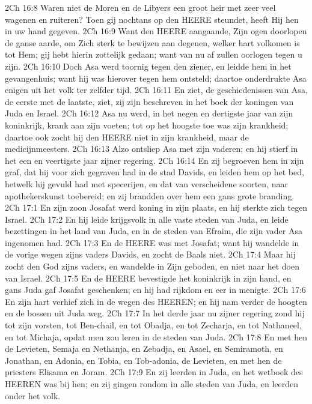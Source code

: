 2Ch 16:8  Waren niet de Moren en de Libyers een groot heir met zeer veel wagenen en ruiteren? Toen gij nochtans op den HEERE steundet, heeft Hij hen in uw hand gegeven.
2Ch 16:9  Want den HEERE aangaande, Zijn ogen doorlopen de ganse aarde, om Zich sterk te bewijzen aan degenen, welker hart volkomen is tot Hem; gij hebt hierin zottelijk gedaan; want van nu af zullen oorlogen tegen u zijn.
2Ch 16:10  Doch Asa werd toornig tegen den ziener, en leidde hem in het gevangenhuis; want hij was hierover tegen hem ontsteld; daartoe onderdrukte Asa enigen uit het volk ter zelfder tijd.
2Ch 16:11  En ziet, de geschiedenissen van Asa, de eerste met de laatste, ziet, zij zijn beschreven in het boek der koningen van Juda en Israel.
2Ch 16:12  Asa nu werd, in het negen en dertigste jaar van zijn koninkrijk, krank aan zijn voeten; tot op het hoogste toe was zijn krankheid; daartoe ook zocht hij den HEERE niet in zijn krankheid, maar de medicijnmeesters.
2Ch 16:13  Alzo ontsliep Asa met zijn vaderen; en hij stierf in het een en veertigste jaar zijner regering.
2Ch 16:14  En zij begroeven hem in zijn graf, dat hij voor zich gegraven had in de stad Davids, en leiden hem op het bed, hetwelk hij gevuld had met specerijen, en dat van verscheidene soorten, naar apothekerskunst toebereid; en zij brandden over hem een gans grote branding.
2Ch 17:1  En zijn zoon Josafat werd koning in zijn plaats, en hij sterkte zich tegen Israel.
2Ch 17:2  En hij leide krijgsvolk in alle vaste steden van Juda, en leide bezettingen in het land van Juda, en in de steden van Efraim, die zijn vader Asa ingenomen had.
2Ch 17:3  En de HEERE was met Josafat; want hij wandelde in de vorige wegen zijns vaders Davids, en zocht de Baals niet.
2Ch 17:4  Maar hij zocht den God zijns vaders, en wandelde in Zijn geboden, en niet naar het doen van Israel.
2Ch 17:5  En de HEERE bevestigde het koninkrijk in zijn hand, en gans Juda gaf Josafat geschenken; en hij had rijkdom en eer in menigte.
2Ch 17:6  En zijn hart verhief zich in de wegen des HEEREN; en hij nam verder de hoogten en de bossen uit Juda weg.
2Ch 17:7  In het derde jaar nu zijner regering zond hij tot zijn vorsten, tot Ben-chail, en tot Obadja, en tot Zecharja, en tot Nathaneel, en tot Michaja, opdat men zou leren in de steden van Juda.
2Ch 17:8  En met hen de Levieten, Semaja en Nethanja, en Zebadja, en Asael, en Semiramoth, en Jonathan, en Adonia, en Tobia, en Tob-adonia, de Levieten, en met hen de priesters Elisama en Joram.
2Ch 17:9  En zij leerden in Juda, en het wetboek des HEEREN was bij hen; en zij gingen rondom in alle steden van Juda, en leerden onder het volk.
